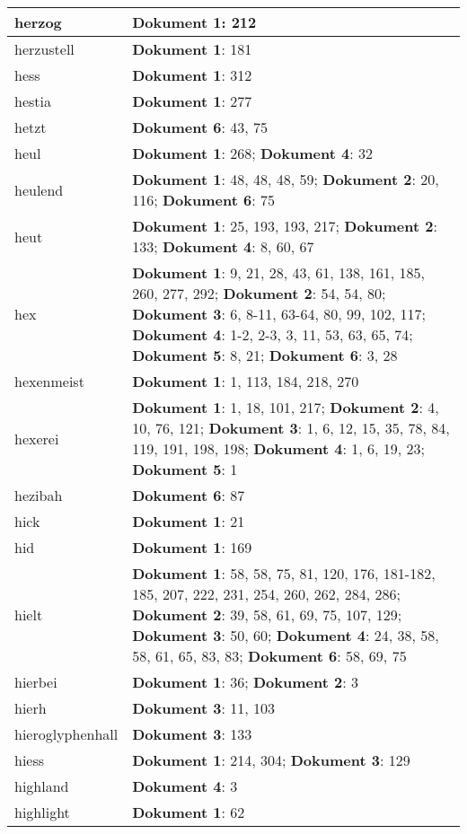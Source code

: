 \documentclass[a5paper]{article}
\begin{document}
\begin{longtable}[l]{|l|p{3in}|}
\hline
herzog & \textbf{Dokument 1}: 212 \\
\hline
herzustell & \textbf{Dokument 1}: 181 \\
\hline
hess & \textbf{Dokument 1}: 312 \\
\hline
hestia & \textbf{Dokument 1}: 277 \\
\hline
hetzt & \textbf{Dokument 6}: 43, 75 \\
\hline
heul & \textbf{Dokument 1}: 268; \textbf{Dokument 4}: 32 \\
\hline
heulend & \textbf{Dokument 1}: 48, 48, 48, 59; \textbf{Dokument 2}: 20, 116; \textbf{Dokument 6}: 75 \\
\hline
heut & \textbf{Dokument 1}: 25, 193, 193, 217; \textbf{Dokument 2}: 133; \textbf{Dokument 4}: 8, 60, 67 \\
\hline
hex & \textbf{Dokument 1}: 9, 21, 28, 43, 61, 138, 161, 185, 260, 277, 292; \textbf{Dokument 2}: 54, 54, 80; \textbf{Dokument 3}: 6, 8-11, 63-64, 80, 99, 102, 117; \textbf{Dokument 4}: 1-2, 2-3, 3, 11, 53, 63, 65, 74; \textbf{Dokument 5}: 8, 21; \textbf{Dokument 6}: 3, 28 \\
\hline
hexenmeist & \textbf{Dokument 1}: 1, 113, 184, 218, 270 \\
\hline
hexerei & \textbf{Dokument 1}: 1, 18, 101, 217; \textbf{Dokument 2}: 4, 10, 76, 121; \textbf{Dokument 3}: 1, 6, 12, 15, 35, 78, 84, 119, 191, 198, 198; \textbf{Dokument 4}: 1, 6, 19, 23; \textbf{Dokument 5}: 1 \\
\hline
hezibah & \textbf{Dokument 6}: 87 \\
\hline
hick & \textbf{Dokument 1}: 21 \\
\hline
hid & \textbf{Dokument 1}: 169 \\
\hline
hielt & \textbf{Dokument 1}: 58, 58, 75, 81, 120, 176, 181-182, 185, 207, 222, 231, 254, 260, 262, 284, 286; \textbf{Dokument 2}: 39, 58, 61, 69, 75, 107, 129; \textbf{Dokument 3}: 50, 60; \textbf{Dokument 4}: 24, 38, 58, 58, 61, 65, 83, 83; \textbf{Dokument 6}: 58, 69, 75 \\
\hline
hierbei & \textbf{Dokument 1}: 36; \textbf{Dokument 2}: 3 \\
\hline
hierh & \textbf{Dokument 3}: 11, 103 \\
\hline
hieroglyphenhall & \textbf{Dokument 3}: 133 \\
\hline
hiess & \textbf{Dokument 1}: 214, 304; \textbf{Dokument 3}: 129 \\
\hline
highland & \textbf{Dokument 4}: 3 \\
\hline
highlight & \textbf{Dokument 1}: 62 \\

\end{longtable}
\end{document}
